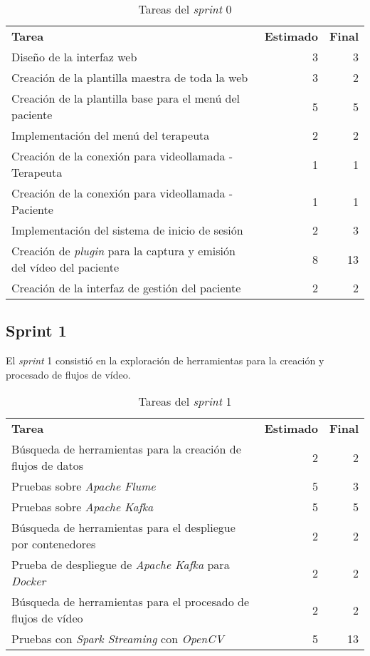 \begin{table}[H]
	\begin{tabularx}{\linewidth}{X r r}
		\toprule \textbf{Tarea} & \textbf{Estimado} & \textbf{Final}\\
		\otoprule
		Diseño de la interfaz web & 3 & 3 \\
		Creación de la plantilla maestra de toda la web & 3 & 2 \\
		Creación de la plantilla base para el menú del paciente & 5 & 5 \\
		Implementación del menú del terapeuta & 2 & 2 \\
		Creación de la conexión para videollamada - Terapeuta & 1 & 1 \\
		Creación de la conexión para videollamada - Paciente & 1 & 1 \\
		Implementación del sistema de inicio de sesión & 2 & 3 \\
		Creación de \textit{plugin} para la captura y emisión del vídeo del paciente & 8 & 13 \\
		Creación de la interfaz de gestión del paciente  & 2 & 2	\\	
		\bottomrule
	\end{tabularx}
	\caption{Tareas del \textit{sprint} 0}
	\label{tab:sprint0}
\end{table}

\subsection{Sprint 1}

El \textit{sprint} 1 consistió en la exploración de herramientas para la creación y procesado de flujos de vídeo. 

\begin{table}[H]
	\begin{tabularx}{\linewidth}{X r r}
		\toprule \textbf{Tarea} & \textbf{Estimado} & \textbf{Final}\\
		\otoprule
		Búsqueda de herramientas para la creación de flujos de datos & 2 & 2 \\
		Pruebas sobre \textit{Apache Flume} & 5 & 3 \\
		Pruebas sobre \textit{Apache Kafka} & 5 & 5 \\
		Búsqueda de herramientas para el despliegue por contenedores & 2 & 2 \\
		Prueba de despliegue de \textit{Apache Kafka} para \textit{Docker} & 2 & 2 \\
		Búsqueda de herramientas para el procesado de flujos de vídeo & 2 & 2 \\
		Pruebas con \textit{Spark Streaming} con \textit{OpenCV} & 5 & 13 \\
		
		\bottomrule
	\end{tabularx}
	\caption{Tareas del \textit{sprint} 1}
	\label{tab:sprint1}
\end{table}

